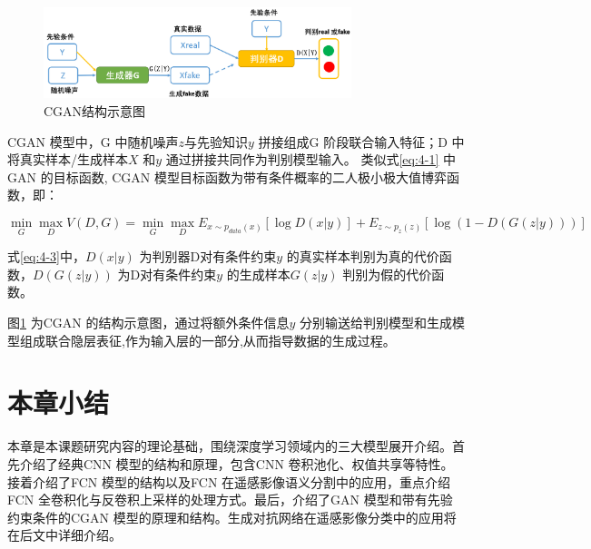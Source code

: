 \begin{figure}[htb]
  \centering
  \includegraphics[width=0.8\textwidth]{figures/cgan}
  \caption{CGAN结构示意图}\label{fig:cgan}
\end{figure}

CGAN 模型中，G 中随机噪声$z$与先验知识$y$ 拼接组成G 阶段联合输入特征；D 中将真实样本/生成样本$X$ 和$y$ 通过拼接共同作为判别模型输入。 类似式\ref{eq:4-1} 中GAN 的目标函数, CGAN 模型目标函数为带有条件概率的二人极小极大值博弈函数，即：

\begin{equation}
  \label{eq:4-3}
  \mathop{\min}_{G} \mathop{\max}_{D} V(D,G) = \mathop{\min}_{G} \mathop{\max}_{D} E_{x \sim p_{data}(x)} [\log D(x|y)] + E_{z \sim p_{z}(z)}[ \log (1-D(G(z|y)))]
\end{equation}

式\ref{eq:4-3}中，$D(x|y)$ 为判别器D对有条件约束$y$ 的真实样本判别为真的代价函数，$D(G(z|y))$ 为D对有条件约束$y$ 的生成样本$G(z|y)$ 判别为假的代价函数。

图\ref{fig:cgan} 为CGAN 的结构示意图，通过将额外条件信息$y$ 分别输送给判别模型和生成模型组成联合隐层表征,作为输入层的一部分,从而指导数据的生成过程。

\section{本章小结}
\label{sec:chap02-4}

本章是本课题研究内容的理论基础，围绕深度学习领域内的三大模型展开介绍。首先介绍了经典CNN 模型的结构和原理，包含CNN 卷积池化、权值共享等特性。接着介绍了FCN 模型的结构以及FCN 在遥感影像语义分割中的应用，重点介绍FCN 全卷积化与反卷积上采样的处理方式。最后，介绍了GAN 模型和带有先验约束条件的CGAN 模型的原理和结构。生成对抗网络在遥感影像分类中的应用将在后文中详细介绍。